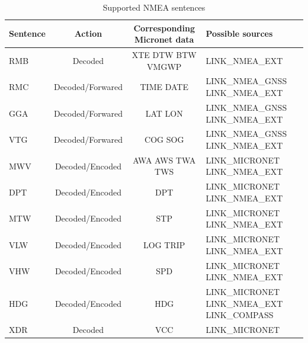 \documentclass{report}
\begin{document}
\begin{table}[h]
	\small
	\begin{tabular}{|l|c|c|p{5cm}|}
		\hline
		\textbf{Sentence} & \textbf{Action}  & \textbf{Corresponding Micronet data} & \textbf{Possible sources} \\
		\hline
		RMB & Decoded & XTE DTW BTW VMGWP & LINK\_NMEA\_EXT \\
		\hline
		RMC & Decoded/Forwared & TIME DATE & LINK\_NMEA\_GNSS LINK\_NMEA\_EXT \\
		\hline
		GGA & Decoded/Forwared & LAT LON & LINK\_NMEA\_GNSS LINK\_NMEA\_EXT \\
		\hline
		VTG & Decoded/Forwared & COG SOG & LINK\_NMEA\_GNSS LINK\_NMEA\_EXT \\
		\hline
		MWV & Decoded/Encoded & AWA AWS TWA TWS & LINK\_MICRONET LINK\_NMEA\_EXT \\
		\hline
		DPT & Decoded/Encoded & DPT & LINK\_MICRONET LINK\_NMEA\_EXT \\
		\hline
		MTW & Decoded/Encoded & STP & LINK\_MICRONET LINK\_NMEA\_EXT \\
		\hline
		VLW & Decoded/Encoded & LOG TRIP & LINK\_MICRONET LINK\_NMEA\_EXT \\
		\hline
		VHW & Decoded/Encoded & SPD & LINK\_MICRONET LINK\_NMEA\_EXT \\
		\hline
		HDG & Decoded/Encoded & HDG & LINK\_MICRONET LINK\_NMEA\_EXT LINK\_COMPASS \\
		\hline
		XDR & Decoded & VCC & LINK\_MICRONET \\
		\hline
	\end{tabular}
	\caption{Supported NMEA sentences}
	\label{table:nmeasentences}
\end{table}
\end{document}
